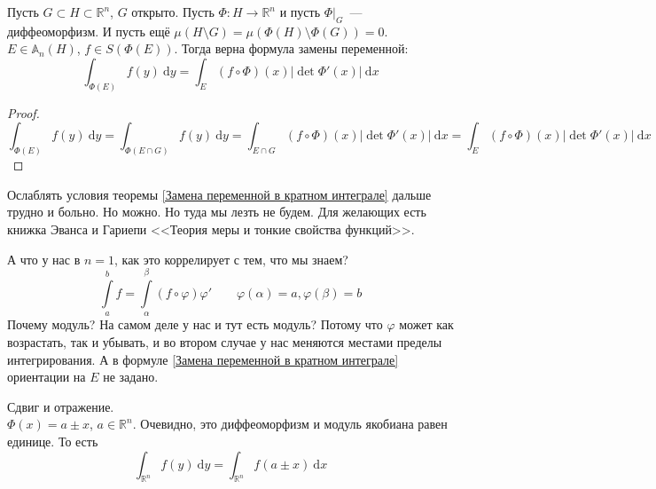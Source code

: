 \documentclass{article}
\let\tmp\varphi
\let\varphi\phi
\let\phi\tmp
\begin{document}
    \begin{corollary}
        Пусть $G\subset H\subset\mathbb R^n$, $G$ открыто. Пусть $\Phi\colon H\to\mathbb R^n$ и пусть $\Phi\big|_G$~--- диффеоморфизм. И пусть ещё $\mu(H\setminus G)=\mu(\Phi(H)\setminus\Phi(G))=0$. $E\in\mathbb A_n(H)$, $f\in S(\Phi(E))$. Тогда верна формула замены переменной:
        $$
        \int_{\Phi(E)}f(y)~\mathrm dy=\int_E(f\circ\Phi)(x)|\det\Phi'(x)|~\mathrm dx
        $$
    \end{corollary}
    \begin{proof}
        $$
        \int_{\Phi(E)}f(y)~\mathrm dy=\int_{\Phi(E\cap G)}f(y)~\mathrm dy=\int_{E\cap G}(f\circ\Phi)(x)|\det\Phi'(x)|~\mathrm dx=\int_E(f\circ\Phi)(x)|\det\Phi'(x)|~\mathrm dx
        $$
    \end{proof}
    \begin{remark}
        Ослаблять условия теоремы \ref{Замена переменной в кратном интеграле} дальше трудно и больно. Но можно. Но туда мы лезть не будем. Для желающих есть книжка Эванса и Гариепи <<Теория меры и тонкие свойства функций>>.
    \end{remark}
    \begin{remark}
        А что у нас в $n=1$, как это коррелирует с тем, что мы знаем?
        $$
        \int\limits_a^bf=\int\limits_\alpha^\beta(f\circ\phi)\phi'\qquad\phi(\alpha)=a,\phi(\beta)=b
        $$
        Почему модуль? На самом деле у нас и тут есть модуль? Потому что $\phi$ может как возрастать, так и убывать, и во втором случае у нас меняются местами пределы интегрирования. А в формуле \ref{Замена переменной в кратном интеграле} ориентации на $E$ не задано.
    \end{remark}
    \begin{example}
        Сдвиг и отражение.\\
        $\Phi(x)=a\pm x$, $a\in\mathbb R^n$. Очевидно, это диффеоморфизм и модуль якобиана равен единице. То есть
        $$
        \int_{\mathbb R^n}f(y)~\mathrm dy=\int_{\mathbb R^n}f(a\pm x)~\mathrm dx
        $$
    \end{example}
\end{document}
